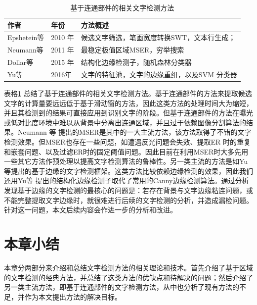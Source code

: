    \begin{table}[!h]
    \centering
    \caption{基于连通部件的相关文字检测方法}
    \begin{tabular}{p{}|p{}| p{}}
    \hline
    作者 & 年份 & 方法概述 \\
    \hline
    Epshetein等\cite{Epshtein2010Detecting} & 2010 年 & 候选文字筛选，笔画宽度转换SWT，文本行生成；\\
    Neumann等\cite{Neumann2011Text} & 2011 年 &   最稳定极值区域MSER，穷举搜索\\
    Dollar等\cite{Dollar2015Fast} & 2015 年 & 结构化边缘检测子，随机森林分类器 \\
    Yu等\cite{Yu2016Scene} & 2016年 & 文字的特征池，文字的边缘重组，以及SVM 分类器 \\
    \hline
    \end{tabular}
    \label{tab.c2_connected_component_based}
    \end{table}

    表格\ref{tab.c2_connected_component_based} 总结了基于连通部件的相关文字检测方法。基于连通部件的方法来提取候选文字的计算量要远远低于基于滑动窗的方法，因此这类方法的处理时间大为缩短，并且其检测到的结果可直接应用到识别文字的阶段。但基于连通部件的方法在曝光或低对比度环境中难以从背景中分离出连通区域，并且过于依赖图像分割算法的结果。Neumann 等\cite{Neumann2010A,Neumann2011Text,Neumann2012Real} 提出的MSER是其中的一大主流方法，该方法取得了不错的文字检测效果。但MSER也存在一些问题，如遭遇反光问题会失效、提取ER 时的重复和嵌套问题、以及过滤ER时的固定阈值问题。因此目前在利用MSER时大多先用一些其它方法作预处理以提高文字检测算法的鲁棒性。另一类主流的方法是如Yu 等\cite{Yu2016Scene}提出的基于边缘的文字检测框架。这类方法比较依赖边缘检测的效果，因此我们还用Yu等\cite{Yu2016Scene} 提出的结构化边缘检测子取代了常用的Canny边缘检测算法。通过分析发现基于边缘的文字检测的最核心的问题是：若存在背景与文字边缘粘连问题，或不能完整提取文字边缘时，就很难进行后续的文字检测的分析，并造成漏检问题。针对这一问题，本文后续内容会作进一步的分析和改进。

    \section{本章小结}
    
    本章分两部分来介绍和总结文字检测方法的相关理论和技术。首先介绍了基于区域的文字检测的经典方法，并总结了这类方法的优缺点和待解决的问题；然后介绍了另一类主流方法，即基于连通部件的文字检测方法，从中也分析了现有方法的不足，并作为本文提出方法的解决目标。

